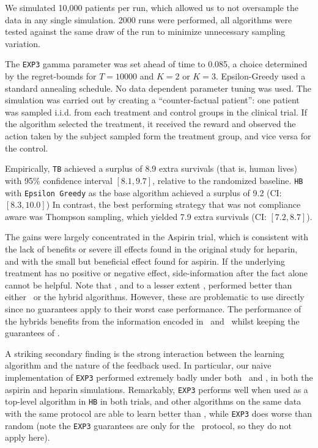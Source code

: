 We simulated 10,000 patients per run, which allowed us to not oversample the data in any single simulation. 2000 runs were performed, all algorithms were tested against the same draw of the run to minimize unnecessary sampling variation. 

The \texttt{EXP3} gamma parameter was set ahead of time to 0.085, a choice determined by the regret-bounds for $T=10000$ and $K=2$ or $K=3$. Epsilon-Greedy used a standard annealing schedule. No data dependent parameter tuning was used.
The simulation was carried out by creating a ``counter-factual patient'': one patient was sampled i.i.d. from each treatment and control groups in the clinical trial. If the algorithm selected the treatment, it received the reward and observed the action taken by the subject sampled form the treatment group, and vice versa for the control.


Empirically, \texttt{TB} achieved a surplus of 8.9 extra survivals (that is, human lives) with 95\% confidence interval $[8.1,9.7]$, relative to the randomized baseline.
\texttt{HB} with \texttt{Epsilon Greedy} as the base algorithm achieved a surplus of 9.2 (CI: $[8.3,10.0]$)
In contrast, the best performing strategy that was not compliance aware was Thompson sampling, which yielded 7.9 extra survivals (CI: $[7.2,8.7]$). 

The gains were largely concentrated in the Aspirin trial, which is consistent with the lack of benefits or severe ill effects found in the original study \cite{ist:97} for heparin, and with the small but beneficial effect found for aspirin. 
If the underlying treatment has no positive or negative effect, side-information after the fact alone cannot be helpful.
Note that \actual, and to a lesser extent \comply, performed better than either \chosen\, or the hybrid algorithms. However, these are problematic to use directly since no guarantees apply to their worst case performance. The performance of the hybrids benefits from the information encoded in \actual\, and \comply\, whilst keeping the guarantees of \chosen. 


A striking secondary finding is the strong interaction between the learning algorithm and the nature of the feedback used. In particular, our naive implementation of \texttt{EXP3} performed extremely badly under both \actual\, and \comply, in both the aspirin and heparin simulations. Remarkably, \texttt{EXP3} performs well when used as a top-level algorithm in \texttt{HB} in both trials, and other algorithms on the same data with the same protocol are able to learn better than \chosen, while \texttt{EXP3} does worse than random (note the \texttt{EXP3} guarantees are only for the \chosen\, protocol, so they do not apply here).



